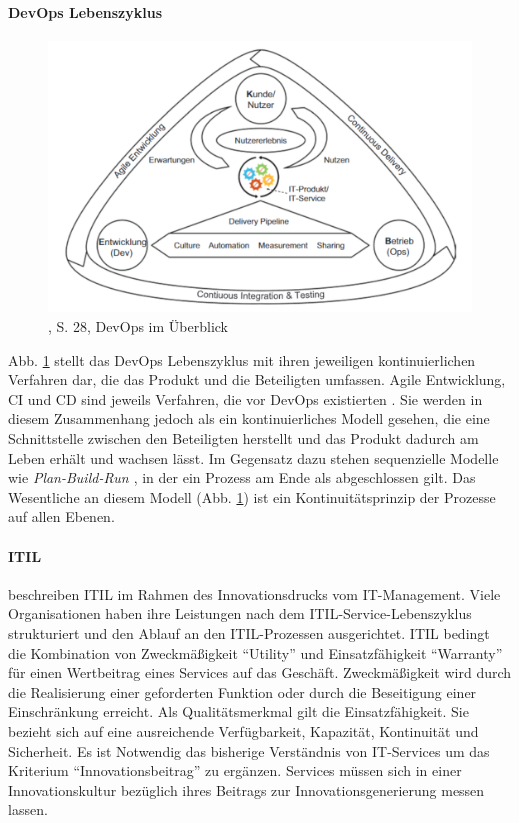 \paragraph{DevOps Lebenszyklus}
\begin{figure}[htbp]
 \centering
 \includegraphics[width=1.0\textwidth]{gfx/devops_ueberblick.PNG}
 \caption{\citet{Alt2017}, S. 28, DevOps im Überblick\label{fig:devops}}
\end{figure}
\medskip
Abb. \ref{fig:devops} stellt das DevOps Lebenszyklus mit ihren jeweiligen kontinuierlichen Verfahren dar, die das Produkt und die Beteiligten umfassen. Agile Entwicklung, \ac{CI} und \ac{CD} sind jeweils Verfahren, die vor DevOps existierten \cite{Alt2017}. Sie werden in diesem Zusammenhang jedoch als ein kontinuierliches Modell gesehen, die eine Schnittstelle zwischen den Beteiligten herstellt und das Produkt dadurch am Leben erhält und wachsen lässt. Im Gegensatz dazu stehen sequenzielle Modelle wie \emph{Plan-Build-Run \cite{Koch2016}}, in der ein Prozess am Ende als abgeschlossen gilt. Das Wesentliche an diesem Modell (Abb. \ref{fig:devops}) ist ein Kontinuitätsprinzip \cite{Alt2017} der Prozesse auf allen Ebenen.

\paragraph{ITIL}
\citet{Alt2017} beschreiben ITIL im Rahmen des Innovationsdrucks vom IT-Management.
Viele Organisationen haben ihre Leistungen nach dem ITIL-Service-Lebenszyklus strukturiert und den Ablauf an den ITIL-Prozessen ausgerichtet. ITIL bedingt die Kombination von Zweckmäßigkeit \enquote{Utility} und Einsatzfähigkeit \enquote{Warranty} für einen Wertbeitrag eines Services auf das Geschäft. Zweckmäßigkeit wird durch die Realisierung einer geforderten Funktion oder durch die Beseitigung einer Einschränkung erreicht. Als Qualitätsmerkmal gilt die Einsatzfähigkeit. Sie bezieht sich auf eine ausreichende Verfügbarkeit, Kapazität, Kontinuität und Sicherheit. Es ist Notwendig das bisherige Verständnis von IT-Services um das Kriterium \enquote{Innovationsbeitrag} zu ergänzen. Services müssen sich in einer Innovationskultur bezüglich ihres Beitrags zur Innovationsgenerierung messen lassen.

